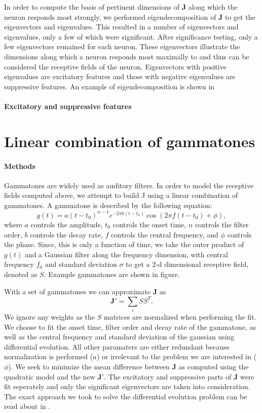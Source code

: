 \documentclass{article}
\begin{document}
In order to compute the basis of pertinent dimensions of $\mathbf{J}$ along which the neuron responds most strongly, we performed eigendecomposition of $\mathbf{J}$ to get the eigenvectors and eigenvalues. This resulted in a number of eigenvectors and eigenvalues, only a few of which were significant. %
After significance testing, only a few eigenvectors remained for each neuron. These eigenvectors illustrate the dimensions along which a neuron responds most maximally to and thus can be considered the receptive fields of the neuron. Eigenvectors with positive eigenvalues are excitatory features and those with negative eigenvalues are suppressive features. An example of eigendecomposition is shown in %

\paragraph{Excitatory and suppressive features}


\section{Linear combination of gammatones}
\paragraph{Methods}
Gammatones are widely used as auditory filters. In order to model the receptive fields computed above, we attempt to build J using a linear combination of gammatones. A gammatone is described by the following equation:$$g(t) = a(t-t_0)^{n-1}e^{-2\pi b(t-t_0)}\cos({2\pi f (t-t_0) + \phi}),
$$ where $a$ controls the amplitude, $t_0$ controls the onset time, $n$ controls the filter order, $b$ controls the decay rate, $f$ controls the central frequency, and $\phi$ controls the phase. Since, this is only a function of time, we take the outer product of $g(t)$ and a Gaussian filter along the frequency dimension, with central frequency $f_0$ and standard deviation $\sigma$ to get a 2-d dimensional receptive field, denoted as $S$. Example gammatones are shown in figure. %

With a set of gammatones we can approximate $\mathbf{J}$ as $$\mathbf{J'} = \sum_{i}{SS^T}.$$ We ignore any weights as the $S$ matrices are normalized when performing the fit. We choose to fit the onset time, filter order and decay rate of the gammatone, as well as the central frequency and standard deviation of the gaussian using differential evolution. All other paramaters are either redundant because normalization is performed ($a$) or irrelevant to the problem we are interested in ($\phi$).  We seek to minimize the mean difference between $\mathbf{J}$ as computed using the quadratic model and the new $\mathbf{J'}$. The excitatory and suppressive parts of $\mathbf{J}$ were fit seperately and only the significant eigenvectors are taken into consideration. The exact approach we took to solve the differential evolution problem can be read about in \cite{rowekamp2017cross}.
\end{document}
